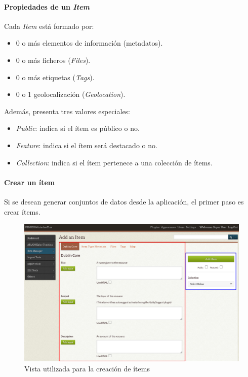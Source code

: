 \documentclass[
]{article}
\providecommand{\tightlist}{%
  \setlength{\itemsep}{0pt}\setlength{\parskip}{0pt}}
\begin{document}
\hypertarget{propiedades-de-un-item}{%
\paragraph{\texorpdfstring{Propiedades de un
\emph{Item}}{Propiedades de un Item}}\label{propiedades-de-un-item}}

Cada \emph{Item} está formado por:

\begin{itemize}
\tightlist
\item
  0 o más elementos de información (metadatos).
\item
  0 o más ficheros (\emph{Files}).
\item
  0 o más etiquetas (\emph{Tags}).
\item
  0 o 1 geolocalización (\emph{Geolocation}).
\end{itemize}

Además, presenta tres valores especiales:

\begin{itemize}
\tightlist
\item
  \emph{Public}: indica si el ítem es público o no.
\item
  \emph{Feature}: indica si el ítem será destacado o no.
\item
  \emph{Collection}: indica si el ítem pertenece a una colección de
  ítems.
\end{itemize}

\hypertarget{crear-un-uxedtem}{%
\paragraph{Crear un ítem}\label{crear-un-uxedtem}}

Si se desean generar conjuntos de datos desde la aplicación, el primer
paso es crear ítems.

\begin{figure}
\hypertarget{add-items-view}{%
\centering
\includegraphics{../_static/images/add-items-view.png}
\caption{Vista utilizada para la creación de
ítems}\label{add-items-view}
}
\end{figure}
\end{document}
